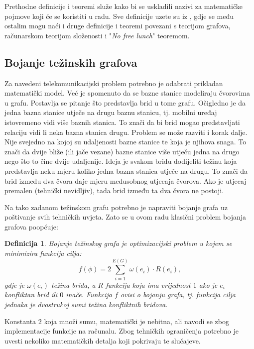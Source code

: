 \documentclass[times, utf8, diplomski, numeric]{fer}
\newtheorem{definition}{Definicija}
\begin{document}
Prethodne definicije i teoremi služe kako bi se uskladili nazivi za matematičke pojmove koji će se koristiti u radu. Sve definicije uzete su iz \cite{lit16, lit15, lit19}, gdje se među ostalim mogu naći i druge definicije i teoremi povezani s teorijom grafova, računarskom teorijom složenosti i "\emph{No free lunch}" teoremom.

\subsection{Bojanje težinskih grafova}

Za navedeni telekomunikacijski problem potrebno je odabrati prikladan matematički model. Već je spomenuto da se bazne stanice modeliraju čvorovima u grafu. Postavlja se pitanje što predstavlja brid u tome grafu. Očigledno je da jedna bazna stanice utječe na drugu baznu stanicu, tj. mobilni uređaj istovremeno vidi više baznih stanica. To znači da bi brid mogao predstavljati relaciju vidi li neka bazna stanica drugu. Problem se može razviti i korak dalje. Nije svejedno na kojoj su udaljenosti bazne stanice te koja je njihova snaga. To znači da dvije bliže (ili jače vezane) bazne stanice više utječu jedna na drugo nego što to čine dvije udaljenije. Ideja je svakom bridu dodijeliti težinu koja predstavlja neku mjeru koliko jedna bazna stanica utječe na drugu. To znači da brid između dva čvora daje mjeru međusobnog utjecaja čvorova. Ako je utjecaj premalen (tehnički nevidljiv), tada brid između ta dva čvora ne postoji.

Na tako zadanom težinskom grafu potrebno je napraviti bojanje grafa uz poštivanje svih tehničkih uvjeta. Zato se u ovom radu klasični problem bojanja grafova poopćuje:

\begin{definition}
Bojanje težinskog grafa je optimizacijski problem u kojem se minimizira funkcija cilja:
\begin{equation}
f(\phi) = 2\sum_{i=1}^{E(G)} \omega(e_i) \cdot R(e_i),
\end{equation}
gdje je $\omega(e_i)$ težina brida, a $R$ funkcija koja ima vrijednost $1$ ako je $e_i$ konfliktan brid ili $0$ inače. Funkcija $f$ ovisi o bojanju grafa, tj. funkcija cilja jednaka je dvostrukoj sumi težina konfliktnih bridova.
\end{definition}

Konstanta $2$ koja množi sumu, matematički je nebitna, ali navodi se zbog implementacije funkcije na računalu. Zbog tehničkih ograničenja potrebno je uvesti nekoliko matematičkih detalja koji pokrivaju te slučajeve.
\end{document}
